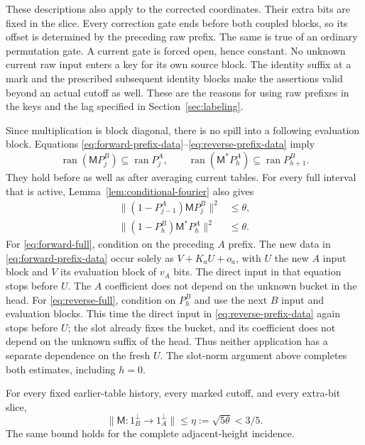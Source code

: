 These descriptions also apply to the corrected coordinates.  Their
extra bits are fixed in the slice.  Every correction gate ends before
both coupled blocks, so its offset is determined by the preceding raw
prefix.  The same is true of an ordinary permutation gate.  A current
gate is forced open, hence constant.  No unknown current raw input
enters a key for its own source block.  The identity suffix at a mark
and the prescribed subsequent identity blocks make the assertions
valid beyond an actual cutoff as well.  These are the reasons for
using raw prefixes in the keys and the lag specified in
Section~\ref{sec:labeling}.

Since multiplication is block diagonal, there is no spill into a
following evaluation block.  Equations
\eqref{eq:forward-prefix-data}--\eqref{eq:reverse-prefix-data} imply
\begin{equation}\label{eq:two-prefix-bands}
 \operatorname{ran}(\mathsf{M}P_j^B)\subseteq\operatorname{ran}P_j^A,
 \qquad
 \operatorname{ran}(\mathsf{M}^*P_h^A)\subseteq\operatorname{ran}P_{h+1}^B.
\end{equation}
They hold before as well as after averaging current tables.
For every full interval that is active, Lemma~\ref{lem:conditional-fourier}
also gives
\begin{align}
 \|(1-P_{j-1}^A)\mathsf{M}P_j^B\|^2&\leq\theta,
       \label{eq:forward-full}\\
 \|(1-P_h^B)\mathsf{M}^*P_h^A\|^2&\leq\theta.
       \label{eq:reverse-full}
\end{align}
For \eqref{eq:forward-full}, condition on the preceding $A$ prefix.
The new data in \eqref{eq:forward-prefix-data} occur solely as
$V+K_aU+o_a$, with $U$ the new $A$ input block and $V$ its evaluation
block of $v_A$ bits.  The direct input in that equation stops before
$U$.  The $A$ coefficient does not depend on the unknown bucket in
the head.  For \eqref{eq:reverse-full}, condition on $P_h^B$ and use
the next $B$ input and evaluation blocks.  This time the direct input
in \eqref{eq:reverse-prefix-data} again stops before $U$; the slot
already fixes the bucket, and its coefficient does not depend on the
unknown suffix of the head.  Thus neither application has a separate
dependence on the fresh $U$.  The slot-norm argument above completes
both estimates, including $h=0$.

\begin{lemma}\label{lem:conditional-mean}
For every fixed earlier-table history, every marked cutoff, and every
extra-bit slice,
\[
 \|\mathsf{M}:1_B^\perp\longrightarrow1_A^\perp\|
       \leq\eta:=\sqrt{5\theta}<3/5.
\]
The same bound holds for the complete adjacent-height incidence.
\end{lemma}

